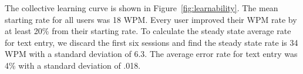\begin{comment}
  \caption{We ask the user to evaluate the performance, design, ergonomics and applicability of Slide on a 5-point Likert Scale (Strongly Disagree, Disagree, neutral, Agree, Strongly Agree).}
  
  \label{table:usability}

\end{figure}


\subsubsection{Subjective }
we ask the user to evaluate each entry mechanism on a 5-point Likert Scale (Strongly Disagree, Disagree, neutral, Agree, Strongly Agree).
Additionally, users are  interviewed to further understand the their qualitative experience.
\end{comment}

The collective learning curve is shown in Figure~\ref{fig:learnability}.
The mean starting rate for all users was 18 WPM.
Every user improved their WPM rate by at least 20\% from their starting rate.
To calculate the steady state average rate for text entry, we discard the first six sessions and find the steady state rate is 34 WPM with a standard deviation of 6.3. The average error rate for text entry was 4\% with a standard deviation of .018.




